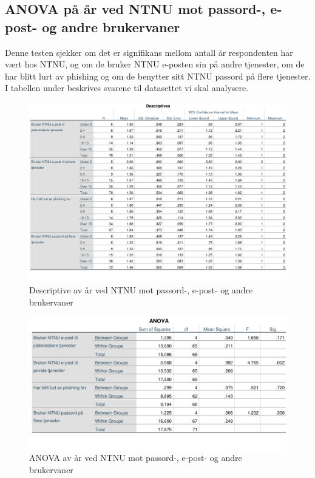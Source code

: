 \subsection{ANOVA på år ved NTNU mot passord-, e-post- og andre brukervaner}
Denne testen sjekker om det er signifikans mellom antall år respondenten har vært hos NTNU, og om de bruker NTNU e-posten sin på andre tjenester, om de har blitt lurt av phishing og om de benytter sitt NTNU passord på flere tjenester. I tabellen under beskrives svarene til datasettet vi skal analysere.
\begin{figure}[H]
    \centering
    \includegraphics[scale=0.5]{case_2/bilder/spss/anova_ttest/ansiennitet_diverse_descriptive.pdf}
    \caption[ansiennitet-diverse-descriptive]{Descriptive av år ved NTNU mot passord-, e-post- og andre brukervaner}
    \label{fig:ansiennitet-diverse-descriptive}
\end{figure}

\begin{figure}[H]
    \centering
    \includegraphics[scale=0.7]{case_2/bilder/spss/anova_ttest/ansiennitet_diverse_anova.pdf}
    \caption[ansiennitet-diverse-ANOVA]{ANOVA av år ved NTNU mot passord-, e-post- og andre brukervaner}
    \label{fig:ansiennitet-diverse-ANOVA}
\end{figure}

